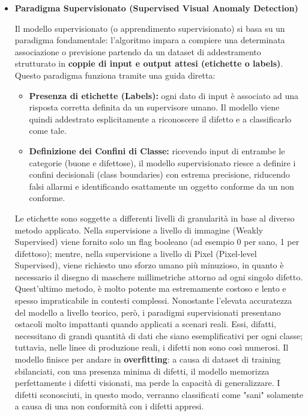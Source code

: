 \begin{itemize}
    \item \textbf{Paradigma Supervisionato (Supervised Visual Anomaly Detection)}
    
    Il modello supervisionato (o apprendimento supervisionato) si basa su un paradigma fondamentale: l'algoritmo impara a compiere una determinata associazione o previsione partendo da un dataset di addestramento strutturato in \textbf{coppie di input e output attesi (etichette o labels)}.
    Questo paradigma funziona tramite una guida diretta:
    \begin{itemize}
        \item \textbf{Presenza di etichette (Labels):} ogni dato di input è associato ad una risposta corretta definita da un supervisore umano. Il modello viene quindi addestrato esplicitamente a riconoscere il difetto e a classificarlo come tale.
        \item \textbf{Definizione dei Confini di Classe:} ricevendo input di entrambe le categorie (buone e difettose), il modello supervisionato riesce a definire i confini decisionali (class boundaries) con estrema precisione, riducendo falsi allarmi e identificando esattamente un oggetto conforme da un non conforme.\cite{Beitieval_et_al._2024}
    \end{itemize}

    Le etichette sono soggette a differenti livelli di granularità in base al diverso metodo applicato. Nella supervisione a livello di immagine (Weakly Supervised) viene fornito solo un flag booleano (ad esempio 0 per sano, 1 per difettoso); mentre, nella supervisione a livello di Pixel (Pixel-level Supervised), viene richiesto uno sforzo umano più minuzioso, in quanto è necessario il disegno di maschere millimetriche attorno ad ogni singolo difetto. Quest'ultimo metodo, è molto potente ma estremamente costoso e lento e spesso impraticabile in contesti complessi.
    Nonostante l'elevata accuratezza del modello a livello teorico, però, i paradigmi supervisionati presentano ostacoli molto impattanti quando applicati a scenari reali.
    Essi, difatti, necessitano di grandi quantità di dati che siano esemplificativi per ogni classe; tuttavia, nelle linee di produzione reali, i difetti non sono così numerosi. Il modello finisce per andare in \textbf{overfitting}: a causa di dataset di training sbilanciati, con una presenza minima di difetti, il modello memorizza perfettamente i difetti visionati, ma perde la capacità di generalizzare.
    I difetti sconosciuti, in questo modo, verranno classificati come "sani" solamente a causa di una non conformità con i difetti appresi.\cite{Beitieval_et_al._2024}
\end{itemize}


